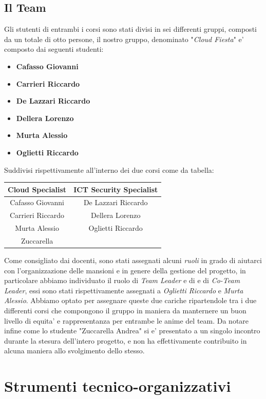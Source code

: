 \documentclass[a4paper]{report}
\begin{document}
	\section{Il Team}
	Gli stutenti di entrambi i corsi sono stati divisi in sei differenti gruppi, composti da un totale di otto persone,
	il nostro gruppo, denominato "\emph{Cloud Fiesta}" e' composto dai seguenti studenti:
	\begin{itemize}
		\item \textbf{Cafasso Giovanni}
		\item \textbf{Carrieri Riccardo}
		\item \textbf{De Lazzari Riccardo}
		\item \textbf{Dellera Lorenzo}
		\item \textbf{Murta Alessio}
		\item \textbf{Oglietti Riccardo}
	\end{itemize}
	Suddivisi rispettivamente all'interno dei due corsi come da tabella:
	\begin{center}
		\begin{tabular}{c|c}
			Cloud Specialist & ICT Security Specialist \\
			\hline
			Cafasso Giovanni & De Lazzari Riccardo \\
			Carrieri Riccardo & Dellera Lorenzo \\
			Murta Alessio & Oglietti Riccardo \\
			Zuccarella & \\
		\end{tabular}
	\end{center}
	Come consigliato dai docenti, sono stati assegnati alcuni \emph{ruoli} in grado di aiutarci con l'organizzazione
	delle mansioni e in genere della gestione del progetto, in particolare abbiamo individuato il ruolo di \emph{Team
	Leader} e di e di \emph{Co-Team Leader}, essi sono stati rispettivamente assegnati a \emph{Oglietti Riccardo} e
	\emph{Murta Alessio}. Abbiamo optato per assegnare queste due cariche ripartendole tra i due differenti corsi che
	compongono il gruppo in maniera da manternere un buon livello di equita' e rappresentanza per entrambe le anime del
	team.  Da notare infine come lo studente "Zuccarella Andrea" si e' presentato a un singolo incontro durante la
	stesura dell'intero progetto, e non ha effettivamente contribuito in alcuna maniera allo svolgimento dello stesso.

\chapter{Strumenti tecnico-organizzativi}
\end{document}
